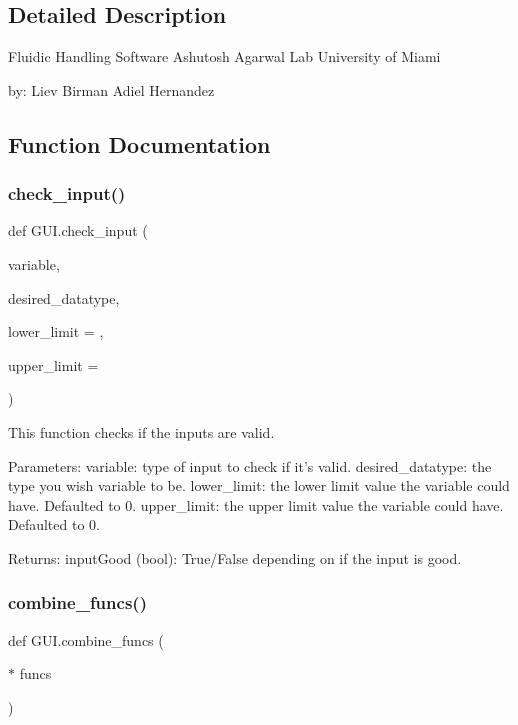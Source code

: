 \subsection{Detailed Description}
\begin{DoxyVerb}Fluidic Handling Software
Ashutosh Agarwal Lab
University of Miami

by:
Liev Birman
Adiel Hernandez
\end{DoxyVerb}
 

\subsection{Function Documentation}
\mbox{\label{namespace_g_u_i_ab5eebe1279ba51c95948fa550f2bc96c}} 
\subsubsection{\texorpdfstring{check\_input()}{check\_input()}}
{\footnotesize\ttfamily def G\+U\+I.\+check\+\_\+input (\begin{DoxyParamCaption}\item[{}]{variable,  }\item[{}]{desired\+\_\+datatype,  }\item[{}]{lower\+\_\+limit = {},  }\item[{}]{upper\+\_\+limit = {} }\end{DoxyParamCaption})}

\begin{DoxyVerb}This function checks if the inputs are valid.

Parameters:
    variable: type of input to check if it's valid.
    desired_datatype: the type you wish variable to be.
    lower_limit: the lower limit value the variable could have. Defaulted to 0.
    upper_limit: the upper limit value the variable could have. Defaulted to 0.

Returns:
    inputGood (bool): True/False depending on  if the input is good.
\end{DoxyVerb}
 \mbox{\label{namespace_g_u_i_a4906784b90d5a5544ca9023bee63983e}} 
\subsubsection{\texorpdfstring{combine\_funcs()}{combine\_funcs()}}
{\footnotesize\ttfamily def G\+U\+I.\+combine\+\_\+funcs (\begin{DoxyParamCaption}\item[{$\ast$}]{funcs }\end{DoxyParamCaption})}

